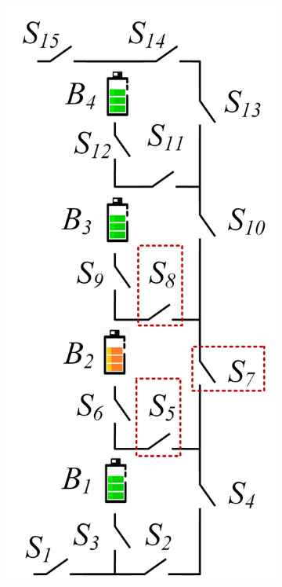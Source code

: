 \documentclass{article}
\begin{document}
\begin{figure}[htbp]
    \centering
    \begin{subfigure}[b]{0.2\textwidth}
        \includegraphics[width=\textwidth]{../attachments/arch-e.png}

\end{subfigure}
\end{figure}
\end{document}
